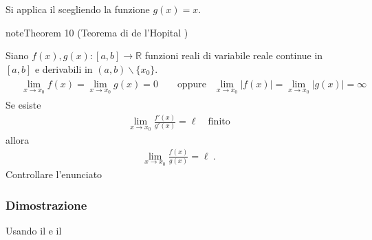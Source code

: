 \documentclass[letterpaper,10pt,italian]{jupyterBook}
\begin{document}
\sphinxAtStartPar
Si applica il {\hyperref[\detokenize{ch/infinitesimal_calculus/derivatives:infinitesimal-calculus-derivatives-thm-lagrange}]{}} scegliendo la funzione \(g(x) = x\).
\label{ch/infinitesimal_calculus/derivatives:thm:infinitesimal-calculus:derivatives:thm:hopital}
\begin{sphinxadmonition}{note}{Theorem 10 (Teorema di de l’Hopital )}



\sphinxAtStartPar
Siano \(f(x), g(x): [a,b] \rightarrow \mathbb{R}\) funzioni reali di variabile reale continue in \([a,b]\) e derivabili in \((a,b) \backslash \{ x_0 \}\).
\begin{equation*}
\begin{split}\begin{aligned}
  & \lim_{x \rightarrow x_0} f(x) = \lim_{x \rightarrow x_0} g(x) = 0 \qquad \text{oppure}
  & \lim_{x \rightarrow x_0}|f(x)|= \lim_{x \rightarrow x_0}|g(x)|= \infty
\end{aligned}\end{split}
\end{equation*}
\sphinxAtStartPar
Se esiste
\begin{equation*}
\begin{split} \lim_{x \rightarrow x_0} \frac{f'(x)}{g'(x)} = \ell \quad \text{finito}\end{split}
\end{equation*}
\sphinxAtStartPar
allora
\begin{equation*}
\begin{split} \lim_{x \rightarrow x_0} \frac{f(x)}{g(x)} = \ell \ . \end{split}
\end{equation*}
\sphinxAtStartPar
{} Controllare l’enunciato
\end{sphinxadmonition}
\subsubsection*{Dimostrazione}

\sphinxAtStartPar
{} Usando il {\hyperref[\detokenize{ch/infinitesimal_calculus/derivatives:infinitesimal-calculus-derivatives-thm-cauchy}]{}} e il {\hyperref[\detokenize{ch/infinitesimal_calculus/derivatives:infinitesimal-calculus-derivatives-thm-rolle}]{}} 
\end{document}
